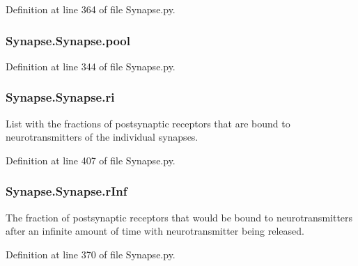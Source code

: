 Definition at line 364 of file Synapse.\+py.

\subsubsection[{\texorpdfstring{pool}{pool}}]{\setlength{\rightskip}{0pt plus 5cm}Synapse.\+Synapse.\+pool}\hypertarget{class_synapse_1_1_synapse_a133990bf3ab7f1efa8b416be73d07a11}{}\label{class_synapse_1_1_synapse_a133990bf3ab7f1efa8b416be73d07a11}


Definition at line 344 of file Synapse.\+py.

\subsubsection[{\texorpdfstring{ri}{ri}}]{\setlength{\rightskip}{0pt plus 5cm}Synapse.\+Synapse.\+ri}\hypertarget{class_synapse_1_1_synapse_adc85234a081ad18bf19473be530dcf78}{}\label{class_synapse_1_1_synapse_adc85234a081ad18bf19473be530dcf78}


List with the fractions of postsynaptic receptors that are bound to neurotransmitters of the individual synapses. 



Definition at line 407 of file Synapse.\+py.

\subsubsection[{\texorpdfstring{r\+Inf}{rInf}}]{\setlength{\rightskip}{0pt plus 5cm}Synapse.\+Synapse.\+r\+Inf}\hypertarget{class_synapse_1_1_synapse_afd263d49a97910efd8955a2aadef50e0}{}\label{class_synapse_1_1_synapse_afd263d49a97910efd8955a2aadef50e0}


The fraction of postsynaptic receptors that would be bound to neurotransmitters after an infinite amount of time with neurotransmitter being released. 



Definition at line 370 of file Synapse.\+py.

